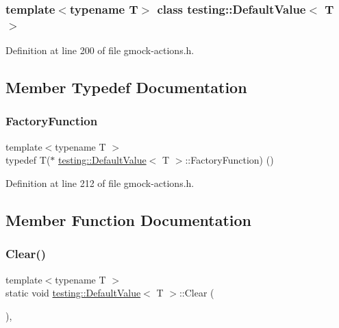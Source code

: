 \subsubsection*{template$<$typename T$>$\newline
class testing\+::\+Default\+Value$<$ T $>$}



Definition at line 200 of file gmock-\/actions.\+h.



\subsection{Member Typedef Documentation}
\mbox{\label{classtesting_1_1DefaultValue_a5763a68d75e0a4c97fcaff708e2df803}} 
\subsubsection{\texorpdfstring{Factory\+Function}{FactoryFunction}}
{\footnotesize\ttfamily template$<$typename T $>$ \\
typedef T($\ast$ \hyperlink{classtesting_1_1DefaultValue}{testing\+::\+Default\+Value}$<$ T $>$\+::Factory\+Function) ()}



Definition at line 212 of file gmock-\/actions.\+h.



\subsection{Member Function Documentation}
\mbox{\label{classtesting_1_1DefaultValue_a8163037b60311177cb211f070c512ee3}} 
\subsubsection{\texorpdfstring{Clear()}{Clear()}}
{\footnotesize\ttfamily template$<$typename T $>$ \\
static void \hyperlink{classtesting_1_1DefaultValue}{testing\+::\+Default\+Value}$<$ T $>$\+::Clear (\begin{DoxyParamCaption}{ }\end{DoxyParamCaption})\hspace{0.3cm}{\ttfamily [inline]}, {\ttfamily [static]}}



